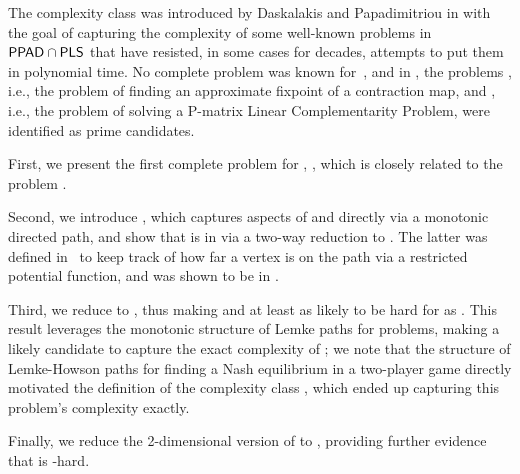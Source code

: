 The complexity class \CLS was introduced by Daskalakis and Papadimitriou in \cite{daskalakis2011continuous} with the goal of capturing the complexity of some well-known problems in $\mathsf{PPAD} \cap \mathsf{PLS}$ that have resisted, in some cases for decades, attempts to put them in polynomial time.  No complete problem was known for~\CLS, and in \cite{daskalakis2011continuous}, the problems \CM, i.e., the problem of finding an approximate fixpoint of a contraction map, and \PLCP, i.e., the problem of solving a P-matrix Linear Complementarity Problem, were identified as prime candidates. 

First, we present the first complete problem for \CLS, \MMCM, which is closely related to the problem \CM.

Second, we introduce \EOPL, which captures aspects of \PPAD and \PLS directly via a monotonic directed path, and show that \EOPL is in \CLS via a two-way reduction to \EOML. The latter was defined in~\cite{hubavcek2017hardness} to keep track of how far a vertex is on the \PPAD path via a restricted potential function, and was shown to be in \CLS.

Third, we reduce \PLCP to \EOPL, thus making \EOPL and \EOML at least as likely to be hard for \CLS as \PLCP. This result leverages the monotonic structure of Lemke paths for \PLCP problems, making \EOPL a likely candidate to capture the exact complexity of \PLCP; we note that the structure of Lemke-Howson paths for finding a Nash equilibrium in a two-player game directly motivated the definition of the complexity class \PPAD, which ended up capturing this problem's complexity exactly.

Finally, we reduce the 2-dimensional version of \CM to \EOPL, providing further evidence that \EOPL is \CLS-hard.
